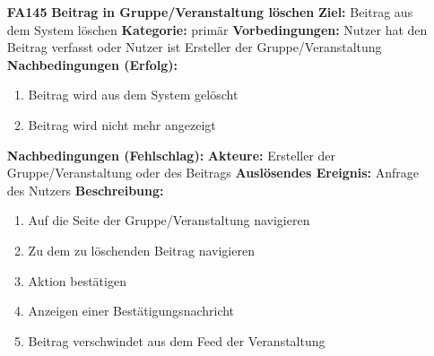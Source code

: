 \documentclass[parskip=full]{scrartcl}
\begin{document}
\begin{itemize}[nosep]
		\item[\textbf{FA145}]\textbf{Beitrag in Gruppe/Veranstaltung löschen}
		\newline \textbf{Ziel:} Beitrag aus dem System löschen
		\newline \textbf{Kategorie:} primär
		\newline \textbf{Vorbedingungen:} Nutzer hat den Beitrag verfasst oder Nutzer ist Ersteller der Gruppe/Veranstaltung
		\newline \textbf{Nachbedingungen (Erfolg):}
		\begin{enumerate}[nosep]
			\item Beitrag wird aus dem System gelöscht
			\item Beitrag wird nicht mehr angezeigt
		\end{enumerate}
		\textbf{Nachbedingungen (Fehlschlag):}
		\newline \textbf{Akteure:} Ersteller der Gruppe/Veranstaltung oder des Beitrags
		\newline \textbf{Auslösendes Ereignis:} Anfrage des Nutzers
		\newline \textbf{Beschreibung:}
		\begin{enumerate}[nosep]
			\item Auf die Seite der Gruppe/Veranstaltung navigieren
			\item Zu dem zu löschenden Beitrag navigieren
			\item Aktion bestätigen
			\item Anzeigen einer Bestätigungsnachricht
			\item Beitrag verschwindet aus dem Feed der Veranstaltung\\
		\end{enumerate}


\end{itemize}
\end{document}
